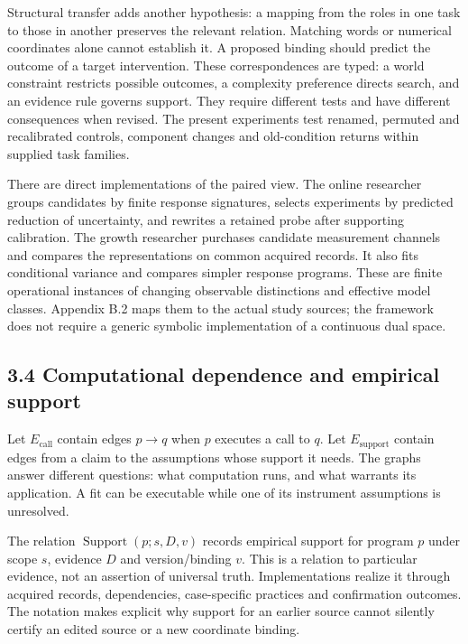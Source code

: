 \documentclass[11pt,a4paper]{article}
\begin{document}
Structural transfer adds another hypothesis: a mapping from the roles in one task to those in another preserves the relevant relation. Matching words or numerical coordinates alone cannot establish it. A proposed binding should predict the outcome of a target intervention. These correspondences are typed: a world constraint restricts possible outcomes, a complexity preference directs search, and an evidence rule governs support. They require different tests and have different consequences when revised. The present experiments test renamed, permuted and recalibrated controls, component changes and old-condition returns within supplied task families.


There are direct implementations of the paired view. The online researcher groups candidates by finite response signatures, selects experiments by predicted reduction of uncertainty, and rewrites a retained probe after supporting calibration. The growth researcher purchases candidate measurement channels and compares the representations on common acquired records. It also fits conditional variance and compares simpler response programs. These are finite operational instances of changing observable distinctions and effective model classes. Appendix B.2 maps them to the actual study sources; the framework does not require a generic symbolic implementation of a continuous dual space.


\subsection*{3.4 Computational dependence and empirical support}

Let \(E_{\mathrm{call}}\) contain edges \(p\to q\) when \(p\) executes a call to \(q\). Let \(E_{\mathrm{support}}\) contain edges from a claim to the assumptions whose support it needs. The graphs answer different questions: what computation runs, and what warrants its application. A fit can be executable while one of its instrument assumptions is unresolved.


The relation \(\operatorname{Support}(p;s,D,v)\) records empirical support for program \(p\) under scope \(s\), evidence \(D\) and version/binding \(v\). This is a relation to particular evidence, not an assertion of universal truth. Implementations realize it through acquired records, dependencies, case-specific practices and confirmation outcomes. The notation makes explicit why support for an earlier source cannot silently certify an edited source or a new coordinate binding.
\end{document}
